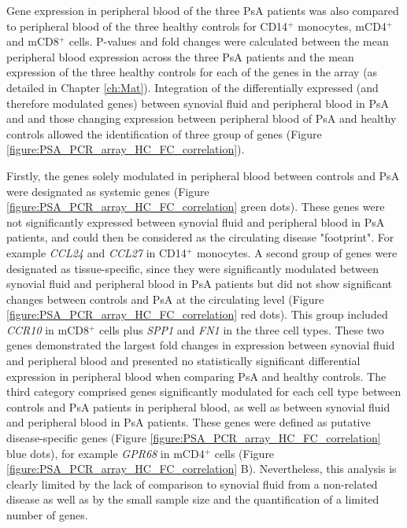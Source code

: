 Gene expression in peripheral blood of the three PsA patients was also compared to peripheral blood of the three healthy controls for CD14$^+$ monocytes, mCD4$^+$ and mCD8$^+$ cells. P-values and fold changes were calculated between the mean peripheral blood expression across the three PsA patients and the mean expression of the three healthy controls for each of the genes in the array (as detailed in Chapter \ref{ch:Mat}). Integration of the differentially expressed (and therefore modulated genes) between synovial fluid and peripheral blood in PsA and and those changing expression between peripheral blood of PsA and healthy controls allowed the identification of three group of genes (Figure \ref{figure:PSA_PCR_array_HC_FC_correlation}). 

Firstly, the genes solely modulated in peripheral blood between controls and PsA were designated as systemic genes (Figure \ref{figure:PSA_PCR_array_HC_FC_correlation} green dots). These genes were not significantly expressed between synovial fluid and peripheral blood in PsA patients, and could then be considered as the circulating disease "footprint". For example \textit{CCL24} and \textit{CCL27} in CD14$^+$ monocytes. A second group of genes were designated as tissue-specific, since they were significantly modulated between synovial fluid and peripheral blood in PsA patients but did not show significant changes between controls and PsA at the circulating level (Figure \ref{figure:PSA_PCR_array_HC_FC_correlation} red dots). This group included \textit{CCR10} in mCD8$^+$ cells plus \textit{SPP1} and \textit{FN1} in the three cell types. These two genes demonstrated the largest fold changes in expression between synovial fluid and peripheral blood and presented no statistically significant differential expression in peripheral blood when comparing PsA and healthy controls. The third category comprised genes significantly modulated for each cell type between controls and PsA patients in peripheral blood, as well as between synovial fluid and peripheral blood in PsA patients. These genes were defined as putative disease-specific genes (Figure \ref{figure:PSA_PCR_array_HC_FC_correlation} blue dots), for example \textit{GPR68} in mCD4$^+$ cells (Figure \ref{figure:PSA_PCR_array_HC_FC_correlation} B). Nevertheless, this analysis is clearly limited by the lack of comparison to synovial fluid from a non-related disease as well as by the small sample size and the quantification of a limited number of genes.


